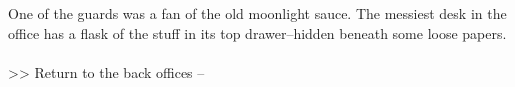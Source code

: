 One of the guards was a fan of the old moonlight sauce. The messiest desk in the office has a flask of the stuff in its top drawer--hidden beneath some loose papers.\\
\\

>> Return to the back offices -- 